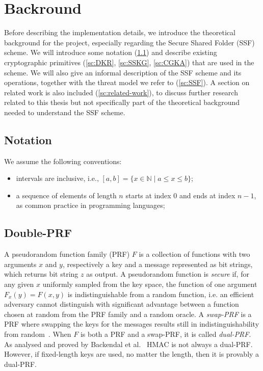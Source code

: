 \chapter{Backround}\label{ch:background}

Before describing the implementation details, we introduce the theoretical
background for the project, especially regarding the Secure Shared Folder 
(SSF) scheme. We will introduce some notation (\cref{sc:notation}) and
describe existing cryptographic primitives (\cref{sc:DKR}, \cref{sc:SSKG}, \cref{sc:CGKA})
that are used in the scheme.
We will also give an informal description of the SSF scheme and its operations,
together with the threat model we refer to (\cref{sc:SSF}).
A section on related work is also included (\cref{sc:related-work}), to discuss further 
research related to this thesis but not specifically 
part of the theoretical background needed to understand the SSF scheme.

\section{Notation}\label{sc:notation}

We assume the following conventions:
\begin{itemize}
    \item intervals are inclusive, i.e., $[a, b] = \{x \in \mathbb{N} \mid a \leq x \leq b\}$;
    \item a sequence of elements of length $n$ starts at index $0$ and ends at index $n-1$, as common practice in programming languages;
\end{itemize}


\section{Double-PRF}\label{sc:DPRF}

A pseudorandom function family (PRF) $F$ is a collection of functions
with two arguments $x$ and $y$, respectively a key and a message
represented as bit strings, which returns bit string $z$ as output.
A pseudorandom function is \textit{secure} if, for any given $x$
uniformly sampled from the key space, the function of one argument
$F_x(y) = F(x, y)$ is indistinguishable from a random function, i.e.
an efficient adversary cannot distinguish with significant advantage
between a function chosen at random from the PRF family and a random oracle.
A \textit{swap-PRF} is a PRF where swapping the keys for the messages
results still in indistinguishability from random~\cite{EPRINT:BelLys15}.
When $F$ is both a PRF and a swap-PRF, it is called \textit{dual-PRF}.
As analysed and proved by Backendal et al.~\cite{C:BBGS23} HMAC is not always a
dual-PRF. However, if fixed-length keys are used, no matter the length,
then it is provably a dual-PRF.

